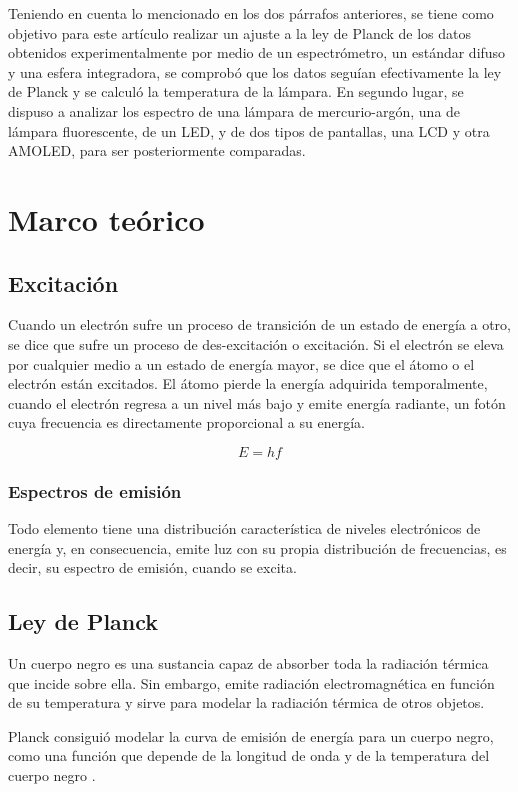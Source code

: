\documentclass[twocolumn]{article}
\begin{document}
Teniendo en cuenta lo mencionado en los dos párrafos anteriores, se tiene como objetivo para este artículo realizar un ajuste a la ley de Planck de los datos obtenidos experimentalmente por medio de un espectrómetro, un estándar difuso y una esfera integradora, se comprobó que los datos seguían efectivamente la ley de Planck y se calculó la temperatura de la lámpara. En segundo lugar, se dispuso a analizar los espectro de una lámpara de mercurio-argón, una de lámpara fluorescente, de un LED, y de dos tipos de pantallas, una LCD y otra AMOLED, para ser posteriormente comparadas.

\section{Marco teórico}

\subsection{Excitación}
Cuando un electrón sufre un proceso de transición de un estado de energía a otro, se dice que sufre un proceso de des-excitación o excitación. Si el electrón se eleva por cualquier medio a un estado de energía
mayor, se dice que el átomo o el electrón están excitados. El átomo pierde la energía adquirida temporalmente, cuando el electrón regresa a un nivel más bajo y emite
energía radiante, un fotón cuya frecuencia es directamente proporcional a su energía\cite{Hewitt2007Conceptual}.

\[
E = hf
\]
\subsubsection{Espectros de emisión}
Todo elemento tiene una distribución característica de niveles electrónicos de
energía y, en consecuencia, emite luz con su propia distribución de frecuencias, es
decir, su espectro de emisión, cuando se excita\cite{Hewitt2007Conceptual}.

\subsection{Ley de Planck}
Un cuerpo negro es una sustancia capaz de absorber toda la radiación térmica que
incide sobre ella\cite{zemansky}. Sin embargo, emite radiación electromagnética en función de su temperatura y sirve para modelar la radiación térmica de otros objetos.

Planck consiguió modelar la curva de emisión de energía para un cuerpo negro, como una función que depende de la longitud de onda y de la temperatura del cuerpo negro \cite{Acevedo2021}.
\end{document}

